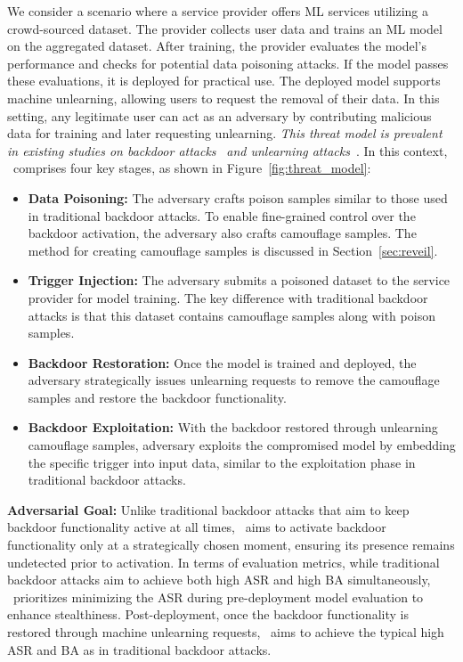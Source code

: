 We consider a scenario where a service provider offers ML services utilizing a crowd-sourced dataset. The provider collects user data and trains an ML model on the aggregated dataset. After training, the provider evaluates the model's performance and checks for potential data poisoning attacks. If the model passes these evaluations, it is deployed for practical use. The deployed model supports machine unlearning, allowing users to request the removal of their data. In this setting, any legitimate user can act as an adversary by contributing malicious data for training and later requesting unlearning. \textit{This threat model is prevalent in existing studies on backdoor attacks}~\cite{trojannn,sig,badnets,refool,ssba,wanet,lf,ftrojan,bppattack,poisonink} \textit{and unlearning attacks}~\cite{DBLP:conf/nips/DiDA0S23,DBLP:conf/aaai/LiuWHM24,uba}. In this context, \methodname~comprises four key stages, as shown in Figure~\ref{fig:threat_model}:
\begin{itemize}
    \item[\circled{1}] \textbf{Data Poisoning:} The adversary crafts poison samples similar to those used in traditional backdoor attacks. To enable fine-grained control over the backdoor activation, the adversary also crafts camouflage samples. The method for creating camouflage samples is discussed in Section~\ref{sec:reveil}.
    \item[\circled{2}] \textbf{Trigger Injection:} The adversary submits a poisoned dataset to the service provider for model training. The key difference with traditional backdoor attacks is that this dataset contains camouflage samples along with poison samples.
    \item[\circled{3}] \textbf{Backdoor Restoration:} Once the model is trained and deployed, the adversary strategically issues unlearning requests to remove the camouflage samples and restore the backdoor functionality.
    \item[\circled{4}] \textbf{Backdoor Exploitation:} With the backdoor restored through unlearning camouflage samples, adversary exploits the compromised model by embedding the specific trigger into input data, similar to the exploitation phase in traditional backdoor attacks.
\end{itemize}

\noindent \textbf{Adversarial Goal:} Unlike traditional backdoor attacks that aim to keep backdoor functionality active at all times, \methodname~aims to activate backdoor functionality only at a strategically chosen moment, ensuring its presence remains undetected prior to activation. In terms of evaluation metrics, while traditional backdoor attacks aim to achieve both high ASR and high BA simultaneously, \methodname~prioritizes minimizing the ASR during pre-deployment model evaluation to enhance stealthiness. Post-deployment, once the backdoor functionality is restored through machine unlearning requests, \methodname~aims to achieve the typical high ASR and BA as in traditional backdoor attacks.

